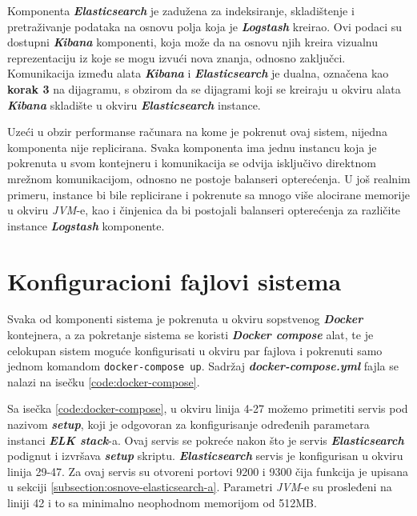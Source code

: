 \par
Komponenta \textit{\textbf{Elasticsearch}} je zadužena za indeksiranje, skladištenje i pretraživanje podataka na osnovu polja koja je \textit{\textbf{Logstash}} kreirao. Ovi podaci su dostupni \textit{\textbf{Kibana}} komponenti, koja može da na osnovu njih kreira vizualnu reprezentaciju iz koje se mogu izvući nova znanja, odnosno zaključci. Komunikacija između alata \textit{\textbf{Kibana}} i \textit{\textbf{Elasticsearch}} je dualna, označena kao \textbf{korak 3} na dijagramu, s obzirom da se dijagrami koji se kreiraju u okviru alata \textit{\textbf{Kibana}} skladište u okviru \textit{\textbf{Elasticsearch}} instance.

\par
Uzeći u obzir performanse računara na kome je pokrenut ovaj sistem, nijedna komponenta nije replicirana. Svaka komponenta ima jednu instancu koja je pokrenuta u svom kontejneru i komunikacija se odvija isključivo direktnom mrežnom komunikacijom, odnosno ne postoje balanseri opterećenja. U još realnim primeru, instance bi bile replicirane i pokrenute sa mnogo više alocirane memorije u okviru \textit{JVM}-e, kao i činjenica da bi postojali balanseri opterećenja za različite instance \textit{\textbf{Logstash}} komponente.

\section{Konfiguracioni fajlovi sistema}
Svaka od komponenti sistema je pokrenuta u okviru sopstvenog \textit{\textbf{Docker}} kontejnera, a za pokretanje sistema se koristi \textit{\textbf{Docker compose}} alat, te je celokupan sistem moguće konfigurisati u okviru par fajlova i pokrenuti samo jednom komandom \texttt{docker-compose up}. Sadržaj \textit{\textbf{docker-compose.yml}} fajla se nalazi na isečku \ref{code:docker-compose}.


\par
Sa isečka \ref{code:docker-compose}, u okviru linija 4-27 možemo primetiti servis pod nazivom \textit{\textbf{setup}}, koji je odgovoran za konfigurisanje određenih parametara instanci \textit{\textbf{ELK stack}}-a. Ovaj servis se pokreće nakon što je servis \textit{\textbf{Elasticsearch}} podignut i izvršava \textit{\textbf{setup}} skriptu. \textit{\textbf{Elasticsearch}} servis je konfigurisan u okviru linija 29-47. Za ovaj servis su otvoreni portovi 9200 i 9300 čija funkcija je upisana u sekciji \ref{subsection:osnove-elasticsearch-a}. Parametri \textit{JVM}-e su prosleđeni na liniji 42 i to sa minimalno neophodnom memorijom od 512MB.

